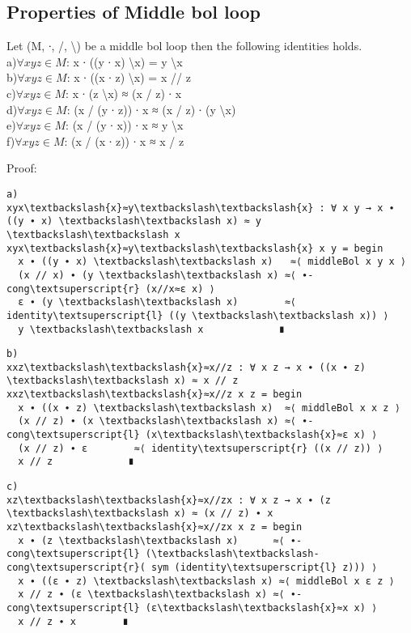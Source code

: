 \subsection{Properties of Middle bol loop}

Let (M, ∙, /, \textbackslash ) be a middle bol loop then the following identities holds.\\
a)\(\forall x y z \in M\): x ∙ ((y ∙ x) \textbackslash x) = y \textbackslash x \\
b)\(\forall x y z \in M\): x ∙ ((x ∙ z) \textbackslash x) = x // z\\
c)\(\forall x y z \in M\): x ∙ (z \textbackslash x) ≈ (x / z) ∙ x\\
d)\(\forall x y z \in M\): (x / (y ∙ z)) ∙ x ≈ (x / z) ∙ (y \textbackslash x)\\
e)\(\forall x y z \in M\): (x / (y ∙ x)) ∙ x ≈ y \textbackslash x\\
f)\(\forall x y z \in M\): (x / (x ∙ z)) ∙ x ≈ x / z

Proof:
\begin{Verbatim}[commandchars=\\\{\},samepage=true]
a)
xyx\textbackslash{x}≈y\textbackslash\textbackslash{x} : ∀ x y → x ∙ ((y ∙ x) \textbackslash\textbackslash x) ≈ y \textbackslash\textbackslash x
xyx\textbackslash{x}≈y\textbackslash\textbackslash{x} x y = begin
  x ∙ ((y ∙ x) \textbackslash\textbackslash x)   ≈⟨ middleBol x y x ⟩
  (x // x) ∙ (y \textbackslash\textbackslash x) ≈⟨ ∙-cong\textsuperscript{r} (x//x≈ε x) ⟩
  ε ∙ (y \textbackslash\textbackslash x)        ≈⟨ identity\textsuperscript{l} ((y \textbackslash\textbackslash x)) ⟩
  y \textbackslash\textbackslash x             ∎
\end{Verbatim}

\begin{Verbatim}[commandchars=\\\{\},samepage=true]
b)
xxz\textbackslash\textbackslash{x}≈x//z : ∀ x z → x ∙ ((x ∙ z) \textbackslash\textbackslash x) ≈ x // z
xxz\textbackslash\textbackslash{x}≈x//z x z = begin
  x ∙ ((x ∙ z) \textbackslash\textbackslash x)  ≈⟨ middleBol x x z ⟩
  (x // z) ∙ (x \textbackslash\textbackslash x) ≈⟨ ∙-cong\textsuperscript{l} (x\textbackslash\textbackslash{x}≈ε x) ⟩
  (x // z) ∙ ε        ≈⟨ identity\textsuperscript{r} ((x // z)) ⟩
  x // z             ∎
\end{Verbatim}

\begin{Verbatim}[commandchars=\\\{\},samepage=true]
c)
xz\textbackslash\textbackslash{x}≈x//zx : ∀ x z → x ∙ (z \textbackslash\textbackslash x) ≈ (x // z) ∙ x
xz\textbackslash\textbackslash{x}≈x//zx x z = begin
  x ∙ (z \textbackslash\textbackslash x)      ≈⟨ ∙-cong\textsuperscript{l} (\textbackslash\textbackslash-cong\textsuperscript{r}( sym (identity\textsuperscript{l} z))) ⟩
  x ∙ ((ε ∙ z) \textbackslash\textbackslash x) ≈⟨ middleBol x ε z ⟩
  x // z ∙ (ε \textbackslash\textbackslash x) ≈⟨ ∙-cong\textsuperscript{l} (ε\textbackslash\textbackslash{x}≈x x) ⟩
  x // z ∙ x        ∎
\end{Verbatim}

